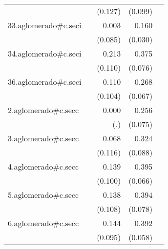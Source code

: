 {\begin{longtable}{l*{4}{D{.}{.}{-1}}}
            &                     &     (0.127)         &     (0.099)         &                     \\
\addlinespace
33.aglomerado#c.seci&                     &       0.003         &       0.160\sym{***}&                     \\
            &                     &     (0.085)         &     (0.030)         &                     \\
\addlinespace
34.aglomerado#c.seci&                     &       0.213         &       0.375\sym{***}&                     \\
            &                     &     (0.110)         &     (0.076)         &                     \\
\addlinespace
36.aglomerado#c.seci&                     &       0.110         &       0.268\sym{***}&                     \\
            &                     &     (0.104)         &     (0.067)         &                     \\
\addlinespace
2.aglomerado#c.secc&                     &       0.000         &       0.256\sym{***}&                     \\
            &                     &         (.)         &     (0.075)         &                     \\
\addlinespace
3.aglomerado#c.secc&                     &       0.068         &       0.324\sym{***}&                     \\
            &                     &     (0.116)         &     (0.088)         &                     \\
\addlinespace
4.aglomerado#c.secc&                     &       0.139         &       0.395\sym{***}&                     \\
            &                     &     (0.100)         &     (0.066)         &                     \\
\addlinespace
5.aglomerado#c.secc&                     &       0.138         &       0.394\sym{***}&                     \\
            &                     &     (0.108)         &     (0.078)         &                     \\
\addlinespace
6.aglomerado#c.secc&                     &       0.144         &       0.392\sym{***}&                     \\
            &                     &     (0.095)         &     (0.058)         &                     \\

\end{longtable}}
